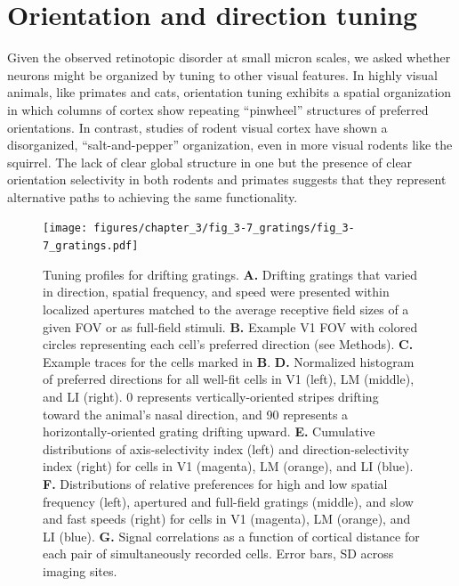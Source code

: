  

\section{Orientation and direction tuning}
Given the observed retinotopic disorder at small micron scales, we asked whether neurons might be organized by tuning to other visual features. In highly visual animals, like primates and cats, orientation tuning exhibits a spatial organization in which columns of cortex show repeating ``pinwheel'' structures of preferred orientations. In contrast, studies of rodent visual cortex have shown a disorganized, ``salt-and-pepper'' organization\cite{Ohki2005}, even in more visual rodents like the squirrel\cite{VanHooser2005}. The lack of clear global structure in one but the presence of clear orientation selectivity in both rodents and primates suggests that they represent alternative paths to achieving the same functionality.

\begin{figure}[t!]
    \texttt{[image: figures/chapter\_3/fig\_3-7\_gratings/fig\_3-7\_gratings.pdf]}
    \vspace{.1in}
    \caption[Responses to drifting gratings]{Tuning profiles for drifting gratings.
    \textbf{A.} Drifting gratings that varied in direction, spatial frequency, and speed were presented within localized apertures matched to the average receptive field sizes of a given FOV or as full-field stimuli.
    \textbf{B.} Example V1 FOV with colored circles representing each cell's preferred direction (see Methods).
    \textbf{C.} Example traces for the cells marked in \textbf{B}. 
    \textbf{D.} Normalized histogram of preferred directions for all well-fit cells in V1 (left), LM (middle), and LI (right). 0 represents vertically-oriented stripes drifting toward the animal's nasal direction, and 90 represents a horizontally-oriented grating drifting upward.
    \textbf{E.} Cumulative distributions of axis-selectivity index (left) and direction-selectivity index (right) for cells in V1 (magenta), LM (orange), and LI (blue).
    \textbf{F.} Distributions of relative preferences for high and low spatial frequency (left), apertured and full-field gratings (middle), and slow and fast speeds (right) for cells in V1 (magenta), LM (orange), and LI (blue).
    \textbf{G.} Signal correlations as a function of cortical distance for each pair of simultaneously recorded cells. Error bars, SD across imaging sites.  
    \label{fig:gratings}}
\end{figure}

